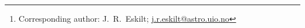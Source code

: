 \newcommand{\oslo}[0]{1}
\newcommand{\milanoA}[0]{2}
\newcommand{\milanoB}[0]{3}
\newcommand{\milanoC}[0]{4}
\newcommand{\triesteB}[0]{5}
\newcommand{\planetek}[0]{6}
\newcommand{\princeton}[0]{7}
\newcommand{\jpl}[0]{8}
\newcommand{\helsinkiA}[0]{9}
\newcommand{\helsinkiB}[0]{10}
\newcommand{\nersc}[0]{11}
\newcommand{\haverford}[0]{12}
\newcommand{\mpa}[0]{13}
\newcommand{\triesteA}[0]{14}
\newcommand{\iia}[0]{2}

\author{\small
J.~R.~Eskilt\inst{\oslo}\thanks{Corresponding author: J.~R.~Eskilt; \url{j.r.eskilt@astro.uio.no}}
\and
K.~Lee\inst{\oslo}
\and
D.~J.~Watts\inst{\oslo}
\and
S.~Nerval\inst{\oslo}
\and
et al.
}
